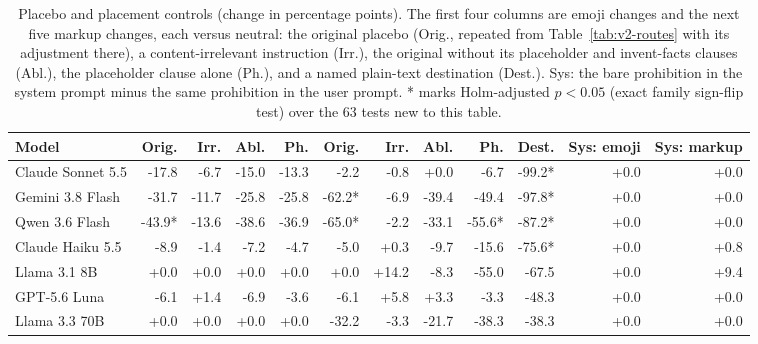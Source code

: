 \begin{table}[t]
\centering
\scriptsize
\caption{Placebo and placement controls (change in percentage points). The first four columns are emoji changes and the next five markup changes, each versus neutral: the original placebo (Orig., repeated from Table~\ref{tab:v2-routes} with its adjustment there), a content-irrelevant instruction (Irr.), the original without its placeholder and invent-facts clauses (Abl.), the placeholder clause alone (Ph.), and a named plain-text destination (Dest.). Sys: the bare prohibition in the system prompt minus the same prohibition in the user prompt. * marks Holm-adjusted $p<0.05$ (exact family sign-flip test) over the 63 tests new to this table.}
\label{tab:v2-controls}
\begin{tabular}{lrrrrrrrrrrr}
\toprule
Model & Orig. & Irr. & Abl. & Ph. & Orig. & Irr. & Abl. & Ph. & Dest. & Sys: emoji & Sys: markup \\
\midrule
Claude Sonnet 5.5 & -17.8 & -6.7 & -15.0 & -13.3 & -2.2 & -0.8 & +0.0 & -6.7 & -99.2* & +0.0 & +0.0 \\
Gemini 3.8 Flash & -31.7 & -11.7 & -25.8 & -25.8 & -62.2* & -6.9 & -39.4 & -49.4 & -97.8* & +0.0 & +0.0 \\
Qwen 3.6 Flash & -43.9* & -13.6 & -38.6 & -36.9 & -65.0* & -2.2 & -33.1 & -55.6* & -87.2* & +0.0 & +0.0 \\
Claude Haiku 5.5 & -8.9 & -1.4 & -7.2 & -4.7 & -5.0 & +0.3 & -9.7 & -15.6 & -75.6* & +0.0 & +0.8 \\
Llama 3.1 8B & +0.0 & +0.0 & +0.0 & +0.0 & +0.0 & +14.2 & -8.3 & -55.0 & -67.5 & +0.0 & +9.4 \\
GPT-5.6 Luna & -6.1 & +1.4 & -6.9 & -3.6 & -6.1 & +5.8 & +3.3 & -3.3 & -48.3 & +0.0 & +0.0 \\
Llama 3.3 70B & +0.0 & +0.0 & +0.0 & +0.0 & -32.2 & -3.3 & -21.7 & -38.3 & -38.3 & +0.0 & +0.0 \\
\bottomrule
\end{tabular}
\end{table}
